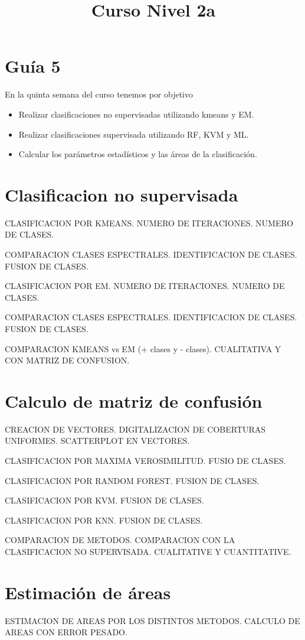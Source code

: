 \documentclass[a4paper]{article}
\title{Curso Nivel 2a}
\begin{document}
\section{Guía 5}
En la quinta semana del curso tenemos por objetivo
\begin{itemize}
    \item Realizar clasificaciones no supervisadas utilizando kmeans y EM.
    \item Realizar clasificaciones supervisada utilizando RF, KVM y ML.
    \item Calcular los parámetros estadísticos y las áreas de la clasificación.
\end{itemize}

\section{Clasificacion no supervisada}

CLASIFICACION POR KMEANS. NUMERO DE ITERACIONES. NUMERO DE CLASES.

COMPARACION CLASES ESPECTRALES. IDENTIFICACION DE CLASES. FUSION DE CLASES.

CLASIFICACION POR EM. NUMERO DE ITERACIONES. NUMERO DE CLASES.

COMPARACION CLASES ESPECTRALES. IDENTIFICACION DE CLASES. FUSION DE CLASES.

COMPARACION KMEANS vs EM (+ clases y - clases). CUALITATIVA Y CON MATRIZ DE CONFUSION.

\section{Calculo de matriz de confusión}
CREACION DE VECTORES. DIGITALIZACION DE COBERTURAS UNIFORMES. SCATTERPLOT EN VECTORES.

CLASIFICACION POR MAXIMA VEROSIMILITUD. FUSIO DE CLASES.

CLASIFICACION POR RANDOM FOREST. FUSION DE CLASES.

CLASIFICACION POR KVM. FUSION DE CLASES.

CLASIFICACION POR KNN. FUSION DE CLASES.

COMPARACION DE METODOS. COMPARACION CON LA CLASIFICACION NO SUPERVISADA. CUALITATIVE Y CUANTITATIVE.

\section{Estimación de áreas}

ESTIMACION DE AREAS POR LOS DISTINTOS METODOS. CALCULO DE AREAS CON ERROR PESADO.
\end{document}
